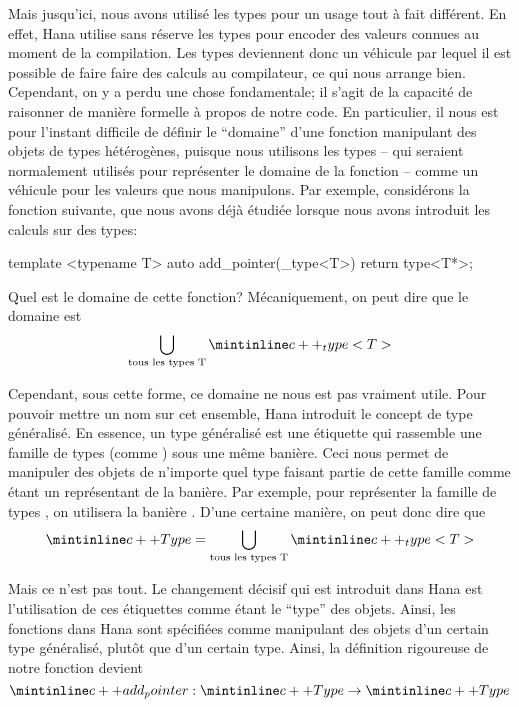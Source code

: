 Mais jusqu'ici, nous avons utilisé les types pour un usage tout à fait
différent. En effet, Hana utilise sans réserve les types pour encoder des
valeurs connues au moment de la compilation. Les types deviennent donc un
véhicule par lequel il est possible de faire faire des calculs au compilateur,
ce qui nous arrange bien. Cependant, on y a perdu une chose fondamentale; il
s'agit de la capacité de raisonner de manière formelle à propos de notre code.
En particulier, il nous est pour l'instant difficile de définir le ``domaine''
d'une fonction manipulant des objets de types hétérogènes, puisque nous
utilisons les types -- qui seraient normalement utilisés pour représenter le
domaine de la fonction -- comme un véhicule pour les valeurs que nous
manipulons. Par exemple, considérons la fonction suivante, que nous avons
déjà étudiée lorsque nous avons introduit les calculs sur des types:
\begin{cpp}
    template <typename T>
    auto add_pointer(_type<T>) {
        return type<T*>;
    }
\end{cpp}

Quel est le domaine de cette fonction? Mécaniquement, on peut dire que le
domaine est
\[
    \bigcup_{\text{tous les types T}} \icpp{_type<T>}
\]

Cependant, sous cette forme, ce domaine ne nous est pas vraiment utile. Pour
pouvoir mettre un nom sur cet ensemble, Hana introduit le concept de type
généralisé. En essence, un type généralisé est une étiquette qui rassemble
une famille de types (comme ) sous une même banière. Ceci
nous permet de manipuler des objets de n'importe quel type faisant partie
de cette famille comme étant un représentant de la banière. Par exemple,
pour représenter la famille de types , on utilisera la
banière . D'une certaine manière, on peut donc dire que
\[
    \icpp{Type} = \bigcup_{\text{tous les types T}} \icpp{_type<T>}
\]

Mais ce n'est pas tout. Le changement décisif qui est introduit dans Hana
est l'utilisation de ces étiquettes comme étant le ``type'' des objets.
Ainsi, les fonctions dans Hana sont spécifiées comme manipulant des objets
d'un certain type généralisé, plutôt que d'un certain type. Ainsi, la
définition rigoureuse de notre fonction  devient
\[
    \icpp{add_pointer} : \icpp{Type} \to \icpp{Type}
\]

